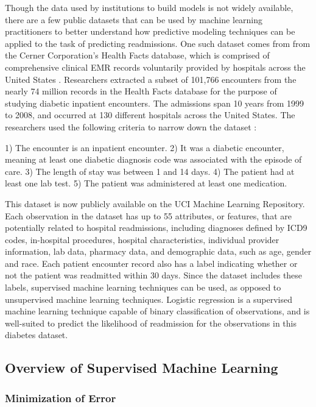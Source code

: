 \documentclass[sigconf]{acmart}
\begin{document}
Though the data used by institutions to build models is not widely available, there are a few public datasets that can be used by machine learning practitioners to better understand how predictive modeling techniques can be applied to the task of predicting readmissions. One such dataset comes from from the Cerner Corporation's Health Facts database, which is comprised of comprehensive clinical EMR records voluntarily provided by hospitals across the United States \cite{cite11}.
Researchers extracted a subset of 101,766 encounters from the nearly 74 million records in the Health Facts database for the purpose of studying diabetic inpatient encounters. The admissions span 10 years from 1999 to 2008, and occurred at 130 different hospitals across the United States. The researchers used the following criteria to narrow down the dataset \cite{cite11}:

1) The encounter is an inpatient encounter.
2) It was a diabetic encounter, meaning at least one diabetic diagnosis code was associated with the episode of care.
3) The length of stay was between 1 and 14 days.
4) The patient had at least one lab test.
5) The patient was administered at least one medication.

This dataset is now publicly available on the UCI Machine Learning Repository. Each observation in the dataset has up to 55 attributes, or features, that are potentially related to hospital readmissions, including diagnoses defined by ICD9 codes, in-hospital procedures, hospital characteristics, individual provider information, lab data, pharmacy data, and demographic data, such as age, gender and race. Each patient encounter record also has a label indicating whether or not the patient was readmitted within 30 days. Since the dataset includes these labels, supervised machine learning techniques can be used, as opposed to unsupervised machine learning techniques. Logistic regression is a supervised machine learning technique capable of binary classification of observations, and is well-suited to predict the likelihood of readmission for the observations in this diabetes dataset.

\subsection{Overview of Supervised Machine Learning}

\subsubsection{Minimization of Error}
\end{document}
